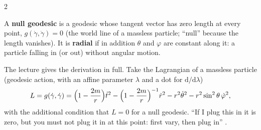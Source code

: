 \begin{paracol}{2}
\begin{definition}\label{def:c22-null}
A \textbf{null geodesic} is a geodesic whose tangent vector has zero length at every point, $g(\dot\gamma,\dot\gamma)=0$ (the world line of a massless particle; ``null'' because the length vanishes). It is \textbf{radial} if in addition $\theta$ and $\varphi$ are constant along it: a particle falling in (or out) without angular motion.
\end{definition}

The lecture gives the derivation in full. Take the Lagrangian of a massless particle (geodesic action, with an affine parameter $\lambda$ and a dot for $\mathrm d/\mathrm d\lambda$)
\[
  L=g(\dot\gamma,\dot\gamma)=\Bigl(1-\frac{2m}{r}\Bigr)\dot t^2-\Bigl(1-\frac{2m}{r}\Bigr)^{-1}\dot r^2-r^2\dot\theta^2-r^2\sin^2\theta\,\dot\varphi^2 ,
\]
with the additional condition that $L=0$ for a null geodesic. ``If I plug this in it is zero, but you must not plug it in at this point: first vary, then plug in'' .


\end{paracol}
